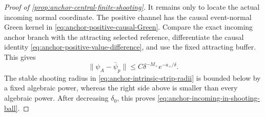 \begin{proof}[Proof of \cref{prop:anchor-central-finite-shooting}]
It remains only to locate the actual incoming normal coordinate.  The
positive channel has the causal event-normal Green kernel in
\cref{eq:anchor-positive-causal-Green}.  Compare the exact incoming anchor
branch with the attracting selected reference, differentiate the causal
identity \cref{eq:anchor-positive-value-difference}, and use the fixed
attracting buffer.  This gives
\begin{equation}
 \|\psi_A-\bar\psi_p\|
 \le C\delta^{-M_+}e^{-a_+/\delta}.                  \label{eq:anchor-positive-reference-flatness}
\end{equation}
The stable shooting radius in
\cref{eq:anchor-intrinsic-strip-radii} is bounded below by a fixed
algebraic power, whereas the right side above is smaller than every
algebraic power.  After decreasing \(\delta_0\), this proves
\cref{eq:anchor-incoming-in-shooting-ball}.
\end{proof}

